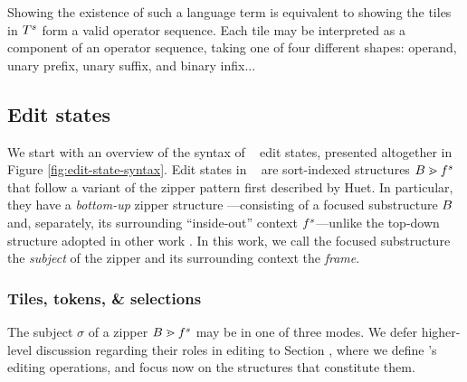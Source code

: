 Showing the existence of such a language term
is equivalent to showing the tiles in $T^s$
form a valid operator sequence.
Each tile may be interpreted as a component
of an operator sequence, taking one of four
different shapes: operand, unary prefix,
unary suffix, and binary infix...



\subsection{Edit states} \label{sec:edit-states}



We start with an overview of the syntax of \ty~ edit states,
presented altogether in Figure \ref{fig:edit-state-syntax}.
Edit states in \ty~ are sort-indexed structures
$B \gtrdot f^s$ that follow a variant
of the zipper pattern first described by Huet.
In particular, they have a \emph{bottom-up}
zipper structure ---consisting of a focused substructure
$B$ and, separately,
its surrounding ``inside-out'' context $f^s$---unlike
the top-down structure adopted in other work .
In this work, we call the focused substructure the \emph{subject} of
the zipper and its surrounding context the \emph{frame}.

\subsubsection{Tiles, tokens, \& selections}
The subject $\sigma$ of a zipper $B \gtrdot f^s$
may be in one of three modes.
We defer higher-level discussion regarding their roles in
editing to Section , where we define \ty's editing
operations, and focus now on the structures that constitute them.




